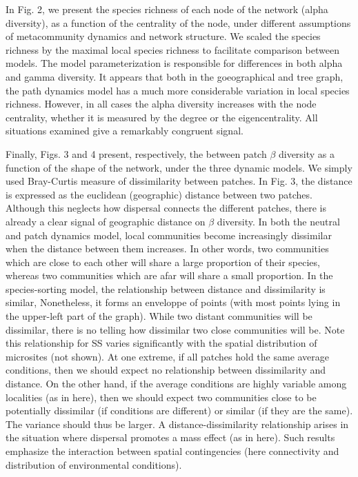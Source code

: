 \documentclass[12pt]{article}
\begin{document}
In Fig. 2, we present the species richness of each node of the network (alpha diversity), as a function of
the centrality of the node, under different assumptions of metacommunity
dynamics and network structure. We scaled the species richness by the maximal local species richness to 
facilitate comparison between models. The model parameterization is responsible for differences in both alpha and gamma diversity.  It appears that both in the goeographical and
tree graph, the path dynamics model has a much more considerable variation in local species richness. 
However, in all cases the alpha diversity increases with the node centrality, whether it is
measured by the degree or the eigencentrality. All situations examined give a
remarkably congruent signal. 


Finally, Figs. 3 and 4 present, respectively, the between patch $\beta$
diversity as a function of the shape of the network, under the three dynamic models. We simply used Bray-Curtis measure of dissimilarity between patches. 
In Fig. 3, the distance is expressed as the euclidean (geographic) distance
between two patches. Although this neglects how dispersal connects the different
patches, there is already a clear signal of geographic distance on $\beta$ diversity. In both the
neutral and patch dynamics model, local communities become increasingly
dissimilar when the distance between them increases. In other words, two
communities which are close to each other will share a large proportion of their
species, whereas two communities which are afar will share a small proportion.
In the species-sorting model, the relationship between distance and
dissimilarity is similar, Nonetheless, it forms an enveloppe of points (with
most points lying in the upper-left part of the graph). While two distant
communities will be dissimilar, there is no telling how dissimilar two close
communities will be. Note this relationship for SS varies significantly with the spatial distribution of microsites (not shown). At one extreme, if all patches hold the same average conditions, then we should expect no relationship between dissimilarity and distance. On the other hand, if the average conditions are highly variable among localities (as in here), then we should expect two communities close to be potentially dissimilar (if conditions are different) or similar (if they are the same). The variance should thus be larger. A distance-dissimilarity relationship arises in the situation where dispersal promotes a mass effect (as in here). Such results emphasize the interaction between spatial contingencies (here connectivity and distribution of environmental conditions).  
\end{document}
